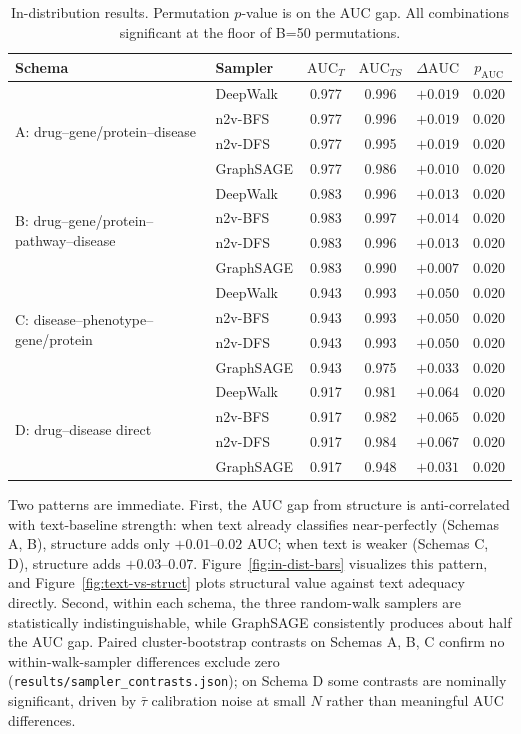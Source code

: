 \documentclass[11pt]{article}
\begin{document}
\begin{table}[h!]
\centering
\caption{In-distribution results. Permutation $p$-value is on the AUC gap. All combinations significant at the floor of B=50 permutations.}
\label{tab:in-dist}
\small
\begin{tabular}{l l c c c c}
\toprule
Schema & Sampler & $\mathrm{AUC}_T$ & $\mathrm{AUC}_{TS}$ & $\Delta\mathrm{AUC}$ & $p_{\mathrm{AUC}}$ \\
\midrule
\multirow{4}{*}{A: drug--gene/protein--disease}
& DeepWalk     & 0.977 & 0.996 & $+0.019$ & 0.020 \\
& n2v-BFS      & 0.977 & 0.996 & $+0.019$ & 0.020 \\
& n2v-DFS      & 0.977 & 0.995 & $+0.019$ & 0.020 \\
& GraphSAGE    & 0.977 & 0.986 & $+0.010$ & 0.020 \\
\midrule
\multirow{4}{*}{B: drug--gene/protein--pathway--disease}
& DeepWalk     & 0.983 & 0.996 & $+0.013$ & 0.020 \\
& n2v-BFS      & 0.983 & 0.997 & $+0.014$ & 0.020 \\
& n2v-DFS      & 0.983 & 0.996 & $+0.013$ & 0.020 \\
& GraphSAGE    & 0.983 & 0.990 & $+0.007$ & 0.020 \\
\midrule
\multirow{4}{*}{C: disease--phenotype--gene/protein}
& DeepWalk     & 0.943 & 0.993 & $+0.050$ & 0.020 \\
& n2v-BFS      & 0.943 & 0.993 & $+0.050$ & 0.020 \\
& n2v-DFS      & 0.943 & 0.993 & $+0.050$ & 0.020 \\
& GraphSAGE    & 0.943 & 0.975 & $+0.033$ & 0.020 \\
\midrule
\multirow{4}{*}{D: drug--disease direct}
& DeepWalk     & 0.917 & 0.981 & $+0.064$ & 0.020 \\
& n2v-BFS      & 0.917 & 0.982 & $+0.065$ & 0.020 \\
& n2v-DFS      & 0.917 & 0.984 & $+0.067$ & 0.020 \\
& GraphSAGE    & 0.917 & 0.948 & $+0.031$ & 0.020 \\
\bottomrule
\end{tabular}
\end{table}

Two patterns are immediate. First, the AUC gap from structure is anti-correlated with text-baseline strength: when text already classifies near-perfectly (Schemas A, B), structure adds only $+0.01$--$0.02$ AUC; when text is weaker (Schemas C, D), structure adds $+0.03$--$0.07$. Figure~\ref{fig:in-dist-bars} visualizes this pattern, and Figure~\ref{fig:text-vs-struct} plots structural value against text adequacy directly. Second, within each schema, the three random-walk samplers are statistically indistinguishable, while GraphSAGE consistently produces about half the AUC gap. Paired cluster-bootstrap contrasts on Schemas A, B, C confirm no within-walk-sampler differences exclude zero (\texttt{results/sampler\_contrasts.json}); on Schema D some contrasts are nominally significant, driven by $\bar\tau$ calibration noise at small $N$ rather than meaningful AUC differences.
\end{document}
